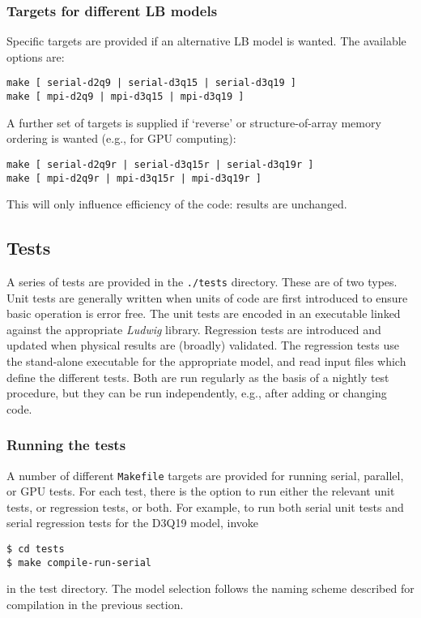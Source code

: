 \subsubsection{Targets for different LB models}

Specific targets are provided if an alternative LB model is wanted.
The available options are:
\begin{lstlisting}
make [ serial-d2q9 | serial-d3q15 | serial-d3q19 ]
make [ mpi-d2q9 | mpi-d3q15 | mpi-d3q19 ]
\end{lstlisting}
A further set of targets is supplied if `reverse' or structure-of-array
memory ordering is wanted (e.g., for GPU computing):
\begin{lstlisting}
make [ serial-d2q9r | serial-d3q15r | serial-d3q19r ]
make [ mpi-d2q9r | mpi-d3q15r | mpi-d3q19r ]
\end{lstlisting}
This will only influence efficiency of the code: results are unchanged.

\subsection{Tests}

A series of tests are provided in the \texttt{./tests} directory. These
are of two types. Unit tests are generally written when units of code
are first introduced to ensure basic operation is error free. The unit
tests are encoded in an executable linked against the appropriate
\textit{Ludwig} library.
Regression
tests are introduced and updated when physical results are (broadly)
validated. The regression tests use the stand-alone executable for
the appropriate model, and read input files which define the different
tests.
Both are run regularly as the basis of a nightly test procedure, but
they can be run independently, e.g., after adding or changing code.


\subsubsection{Running the tests}

A number of different \texttt{Makefile} targets are provided for
running serial, parallel,
or GPU tests. For each test, there is the option to run either
the relevant unit tests, or regression tests, or both. For example, to
run both serial unit tests and serial regression tests for the D3Q19
model, invoke
\begin{lstlisting}
$ cd tests
$ make compile-run-serial
\end{lstlisting}
in the test directory.
The model selection follows the naming scheme described for compilation
in the previous section.


